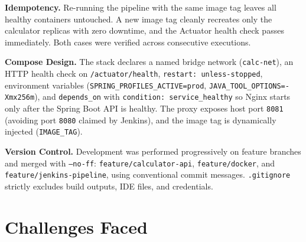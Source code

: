 \documentclass[11pt,a4paper]{article}
\begin{document}
\textbf{Idempotency.} Re-running the pipeline with the same image tag leaves all healthy containers untouched. A new image tag cleanly recreates only the calculator replicas with zero downtime, and the Actuator health check passes immediately. Both cases were verified across consecutive executions.

\textbf{Compose Design.} The stack declares a named bridge network (\texttt{calc-net}), an HTTP health check on \texttt{/actuator/health}, \texttt{restart: unless-stopped}, environment variables (\texttt{SPRING\_PROFILES\_ACTIVE=prod}, \texttt{JAVA\_TOOL\_OPTIONS=-Xmx256m}), and \texttt{depends\_on} with \texttt{condition: service\_healthy} so Nginx starts only after the Spring Boot API is healthy. The proxy exposes host port \texttt{8081} (avoiding port \texttt{8080} claimed by Jenkins), and the image tag is dynamically injected (\texttt{IMAGE\_TAG}).

\textbf{Version Control.} Development was performed progressively on feature branches and merged with \texttt{--no-ff}: \texttt{feature/calculator-api}, \texttt{feature/docker}, and \texttt{feature/jenkins-pipeline}, using conventional commit messages. \texttt{.gitignore} strictly excludes build outputs, IDE files, and credentials.

\newpage

\section{Challenges Faced}
\end{document}
